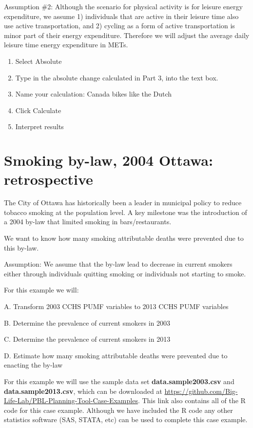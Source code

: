\documentclass[]{book}
\begin{document}
Assumption \#2: Although the scenario for physical activity is for leisure energy expenditure, we assume 1) individuals that are active in their leisure time also use active transportation, and 2) cycling as a form of active transportation is minor part of their energy expenditure. Therefore we will adjust the average daily leisure time energy expenditure in METs.

\begin{enumerate}
\def\labelenumi{\arabic{enumi}.}
\setcounter{enumi}{5}
\item
  Select Absolute
\item
  Type in the absolute change calculated in Part 3, into the text box.
\item
  Name your calculation: Canada bikes like the Dutch
\item
  Click Calculate
\item
  Interpret results
\end{enumerate}

\hypertarget{smoking-by-law-2004-ottawa-retrospective}{%
\section{Smoking by-law, 2004 Ottawa: retrospective}\label{smoking-by-law-2004-ottawa-retrospective}}

The City of Ottawa has historically been a leader in municipal policy to reduce tobacco smoking at the population level. A key milestone was the introduction of a 2004 by-law that limited smoking in bars/restaurants.

We want to know how many smoking attributable deaths were prevented due to this by-law.

Assumption: We assume that the by-law lead to decrease in current smokers either through individuals quitting smoking or individuals not starting to smoke.

For this example we will:

A. Transform 2003 CCHS PUMF variables to 2013 CCHS PUMF variables

B. Determine the prevalence of current smokers in 2003

C. Determine the prevalence of current smokers in 2013

D. Estimate how many smoking attributable deaths were prevented due to enacting the by-law

For this example we will use the sample data set \textbf{data.sample2003.csv} and \textbf{data.sample2013.csv}, which can be downloaded at \url{https://github.com/Big-Life-Lab/PBL-Planning-Tool-Case-Examples}. This link also contains all of the R code for this case example. Although we have included the R code any other statistics software (SAS, STATA, etc) can be used to complete this case example.
\end{document}
